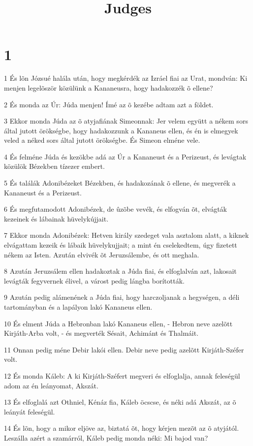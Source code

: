 

\title{Judges}


\chapter{1}

\par 1 És lõn Józsué halála után, hogy megkérdék az Izráel fiai az Urat, mondván: Ki menjen legelõször közülünk a Kananeusra, hogy hadakozzék õ ellene?
\par 2 És monda az Úr: Júda menjen! Ímé az õ kezébe adtam azt a földet.
\par 3 Ekkor monda Júda az õ atyjafiának Simeonnak: Jer velem együtt a nékem sors által jutott örökségbe, hogy hadakozzunk a Kananeus ellen, és én is elmegyek veled a néked sors által jutott örökségbe. És Simeon elméne vele.
\par 4 És felméne Júda és kezökbe adá az Úr a Kananeust és a Perizeust, és levágtak közülök Bézekben tízezer embert.
\par 5 És találák Adonibézeket Bézekben, és hadakozának õ ellene, és megverék a Kananeust és a Perizeust.
\par 6 És megfutamodott Adonibézek, de ûzõbe vevék, és elfogván õt, elvágták kezeinek és lábainak hüvelykújjait.
\par 7 Ekkor monda Adonibézek: Hetven király szedeget vala asztalom alatt, a kiknek elvágattam kezeik és lábaik hüvelykujjait; a mint én cselekedtem, úgy fizetett nékem az Isten. Azután elvivék õt Jeruzsálembe, és ott meghala.
\par 8 Azután Jeruzsálem ellen hadakoztak a Júda fiai, és elfoglalván azt, lakosait levágták fegyvernek élivel, a várost pedig lángba borították.
\par 9 Azután pedig alámenének a Júda fiai, hogy harczoljanak a hegységen, a déli tartományban és a lapályon lakó Kananeus ellen.
\par 10 És elment Júda a Hebronban lakó Kananeus ellen, - Hebron neve azelõtt Kirjáth-Arba volt, - és megverték Sésait, Achimánt és Thalmáit.
\par 11 Onnan pedig méne Debir lakói ellen. Debir neve pedig azelõtt Kirjáth-Széfer volt.
\par 12 És monda Káleb: A ki Kirjáth-Széfert megveri és elfoglalja, annak feleségül adom az én leányomat, Akszát.
\par 13 És elfoglalá azt Othniel, Kénáz fia, Káleb öcscse, és néki adá Akszát, az õ leányát feleségül.
\par 14 És lõn, hogy a mikor eljöve az, biztatá õt, hogy kérjen mezõt az õ atyjától. Leszálla azért a szamárról, Káleb pedig monda néki: Mi bajod van?
